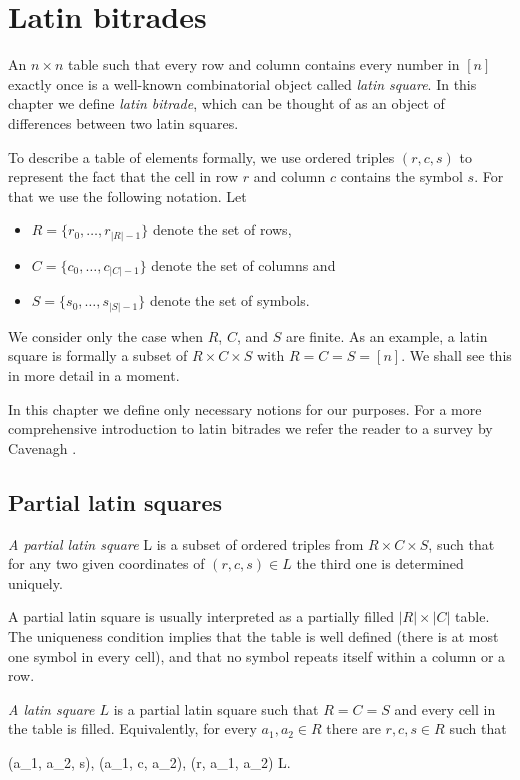 \chapter{Latin bitrades}

An $n \times n$ table such that every row and column contains every number in $[n]$ exactly once is a well-known combinatorial object called \emph{latin square}. In this chapter we define \emph{latin bitrade}, which can be thought of as an object of differences between two latin squares.

To describe a table of elements formally, we use ordered triples $(r,c,s)$ to represent the fact that the cell in row $r$ and column $c$ contains the symbol $s$. For that we use the following notation. Let
\begin{itemize}
	\item $R = \{r_0,\dots,r_{|R|-1}\}$ denote the set of rows,
	\item $C = \{c_0,\dots,c_{|C|-1}\}$ denote the set of columns and
	\item $S = \{s_0,\dots,s_{|S|-1}\}$ denote the set of symbols.
\end{itemize}
We consider only the case when $R$, $C$, and $S$ are finite. As an example, a latin square is formally a subset of $R \times C \times S$ with $R = C = S = [n]$. We shall see this in more detail in a moment.

In this chapter we define only necessary notions for our purposes. For a more comprehensive introduction to latin bitrades we refer the reader to a survey by Cavenagh \cite{Cavenagh08}.

\section{Partial latin squares}

\begin{defn}
\emph{A partial latin square} L is a subset of ordered triples from $R \times C \times S$, such that for any two given coordinates of $(r,c,s)\in L$ the third one is determined uniquely.
\end{defn}

A partial latin square is usually interpreted as a partially filled $|R| \times |C|$ table. The uniqueness condition implies that the table is well defined (there is at most one symbol in every cell), and that no symbol repeats itself within a column or a row.

\begin{defn}
\emph{A latin square $L$} is a partial latin square such that $R=C=S$ and every cell in the table is filled. Equivalently, for every $a_1, a_2 \in R$ there are $r,c,s \in R$ such that
\begin{cosyeqnarray}
	(a_1, a_2, s), (a_1, c, a_2), (r, a_1, a_2) \in L.
\end{cosyeqnarray}
\end{defn}


